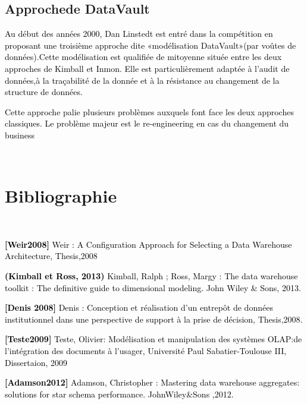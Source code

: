 \documentclass[a4paper,12pt]{report}
\begin{document}
\section{Approchede DataVault}
\textcolor{black}{Au début des années 2000, Dan Linstedt est entré dans la compétition en proposant une troisième approche dite «modélisation DataVault»(par voûtes de données).Cette modélisation est qualifiée de mitoyenne située entre les deux approches de Kimball et Inmon. Elle est particulièrement adaptée à l’audit de données,à la traçabilité de la donnée et à la résistance au changement de la structure de données.}

\textcolor{black}{Cette approche palie plusieurs problèmes auxquels font face les deux approches classiques. Le problème majeur est le re-engineering en cas du changement du business}





\\
\chapter*{Bibliographie}
\\



	\item[] \textcolor{black}{
\textbf{[Weir2008]}  Weir : A Configuration Approach for Selecting a Data Warehouse Architecture, Thesis,2008}
\\

	\item[] \textcolor{black}{
\textbf{(Kimball et Ross, 2013)} Kimball, Ralph ; Ross, Margy : The data warehouse toolkit : The definitive guide to dimensional modeling. John Wiley \& Sons, 2013.	
}
\\

	\item[] \textcolor{black}{
\textbf{[Denis 2008]} Denis : Conception et réalisation d’un entrepôt de données institutionnel dans une perspective de support à la prise de décision, Thesis,2008.}
\\

	\item[] \textcolor{black}{
\textbf{[Teste2009]} Teste, Olivier: Modélisation et manipulation des systèmes OLAP:de l’intégration des documents à l’usager, Université Paul Sabatier-Toulouse III, Dissertaion, 2009}


	\item[] \textcolor{black}{
\textbf{[Adamson2012] } Adamson, Christopher : Mastering data warehouse aggregates: solutions for star schema performance. JohnWiley&Sons ,2012.}
\\
\end{document}
